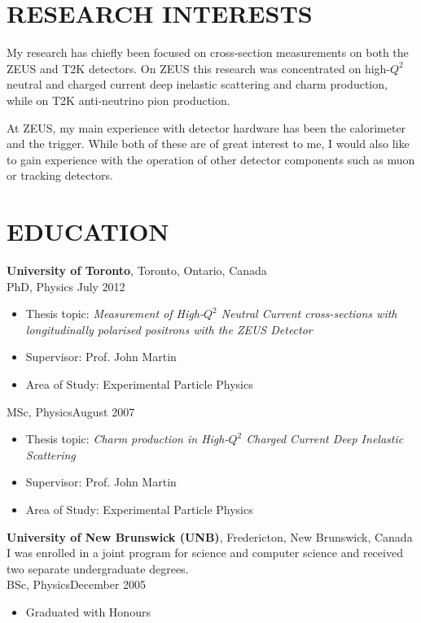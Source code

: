 \documentclass[margin]{res}
\begin{document}
 
\begin{resume} 

\section{RESEARCH INTERESTS}

My research has chiefly been focused on cross-section measurements on both the ZEUS and T2K detectors.  On ZEUS this research was concentrated on high-$Q^2$ neutral and charged current deep inelastic scattering and charm production, while on T2K anti-neutrino pion production.


At ZEUS, my main experience with detector hardware has been the calorimeter and the trigger.  While both of these are of great interest to me, I would also like to gain experience with the operation of other detector components such as muon or tracking detectors.

\section{EDUCATION}

{\bf University of Toronto}, Toronto, Ontario, Canada \\
PhD, Physics \hfill July 2012
\begin{itemize} \itemsep -2pt  %
\item Thesis topic: \textit{Measurement of High-$Q^2$ Neutral Current cross-sections with longitudinally polarised positrons with the ZEUS Detector}
\item Supervisor: Prof. John Martin
\item Area of Study: Experimental Particle Physics
\end{itemize}

MSc, Physics\hfill August 2007 
\begin{itemize} \itemsep -2pt  %
\item Thesis topic: \textit{Charm production in High-$Q^2$ Charged Current Deep Inelastic Scattering}
\item Supervisor: Prof. John Martin
\item Area of Study: Experimental Particle Physics
\end{itemize}

{\bf University of New Brunswick (UNB)}, Fredericton, New Brunswick, Canada \\
I was enrolled in a joint program for science and computer science and received two separate undergraduate degrees.\\
BSc, Physics\hfill December 2005
\begin{itemize} \itemsep -2pt  %
\item Graduated with Honours 
\end{itemize}


\end{resume}
\end{document}
